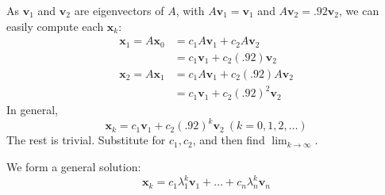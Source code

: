 \documentclass[11pt]{scrartcl}
\theoremstyle{dotlessP}
\theoremstyle{dotlessN}
\begin{document}
\begin{soln}
	As $\bm{v}_1$ and $\bm{v}_2$ are eigenvectors of $A$, with $A\bm{v}_1 = \bm{v}_1$ and $A\bm{v}_2 = .92\bm{v}_2$, we can easily compute each $\bm{x}_k$:
	\begin{align*}
		\bm{x}_1 = A\bm{x}_0 &= c_1 A\bm{v}_1 + c_2 A\bm{v}_2 \\
				 &= c_1\bm{v}_1 + c_2(.92)\bm{v}_2 \\
		\bm{x}_2 = A\bm{x}_1 &= c_1A\bm{v}_1 + c_2(.92)A\bm{v}_2 \\
				 &= c_1\bm{v}_1 + c_2(.92)^2\bm{v}_2
	\end{align*}
	In general,
	\[
		\bm{x}_k = c_1\bm{v}_1 + c_2(.92)^k \bm{v}_2 \ (k = 0,1,2,\dots)
	\] 
	The rest is trivial. Substitute for $c_1,c_2$, and then find $\displaystyle \lim_{k \to \infty}$.
\end{soln}
We form a general solution:
\[
	\bm{x}_k = c_1 \lambda_1^k\bm{v}_1 + \dots + c_n \lambda_n^k \bm{v}_n
\] 
\end{document}
